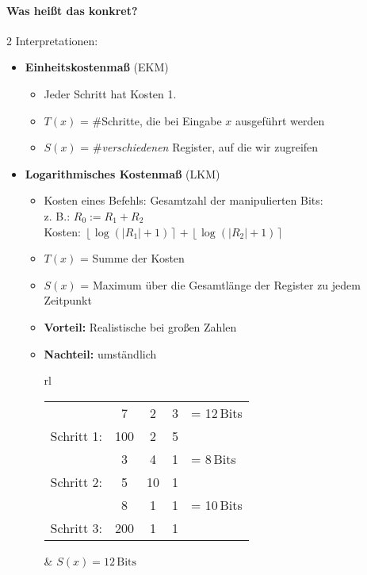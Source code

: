  \paragraph*{Was heißt das konkret?} 2 Interpretationen:
	\begin{itemize}
	 \item \textbf{Einheitskostenmaß} (EKM)
		\begin{itemize}
		\item Jeder Schritt hat Kosten 1.
		\item $T(x)$ = \#Schritte, die bei Eingabe $x$ ausgeführt werden
		\item $S(x)$ = \#\emph{verschiedenen} Register, auf die wir zugreifen
		\end{itemize}
	 \item \textbf{Logarithmisches Kostenmaß} (LKM)
		\begin{itemize}
		 \item Kosten eines Befehls: Gesamtzahl der manipulierten Bits:\\
			z. B.: $R_0 := R_1 + R_2$\\
			Kosten: $\left\lfloor\log(|R_1|+1)\right\rceil + \left\lfloor\log(|R_2|+1)\right\rceil$
		 \item $T(x)$ = Summe der Kosten
		 \item $S(x)$ = Maximum über die Gesamtlänge der Register zu jedem Zeitpunkt
		 \item \textbf{Vorteil:} Realistische bei großen Zahlen
		 \item \textbf{Nachteil:} umständlich
		 \begin{center}
		 \begin{tabular}{rl}
			\begin{minipage}{6cm}
			 \begin{tabular}{r|c|c|c|l}
				\multicolumn{1}{c}{} & \multicolumn{1}{c}{\footnotesize 7} & \multicolumn{1}{c}{\footnotesize 2} & \multicolumn{1}{c}{\footnotesize 3} & \footnotesize= 12\,Bits \\\cline{2-4}
				Schritt 1: & 100 & 2 & 5 & \\\cline{2-4}
				\multicolumn{1}{c}{} & \multicolumn{1}{c}{\footnotesize 3} & \multicolumn{1}{c}{\footnotesize 4} & \multicolumn{1}{c}{\footnotesize 1} & \footnotesize= 8\,Bits \\\cline{2-4}
				Schritt 2: & 5 & 10 & 1 & \\\cline{2-4}
				\multicolumn{1}{c}{} & \multicolumn{1}{c}{\footnotesize 8} & \multicolumn{1}{c}{\footnotesize 1} & \multicolumn{1}{c}{\footnotesize 1} &\footnotesize= 10\,Bits \\\cline{2-4}
				Schritt 3: & 200 & 1 & 1 & \\\cline{2-4}
			 \end{tabular}
			\end{minipage}
		  & $S(x) = 12\,\text{Bits}$
		 \end{tabular}
		 \end{center}
		\end{itemize}
	\end{itemize}
